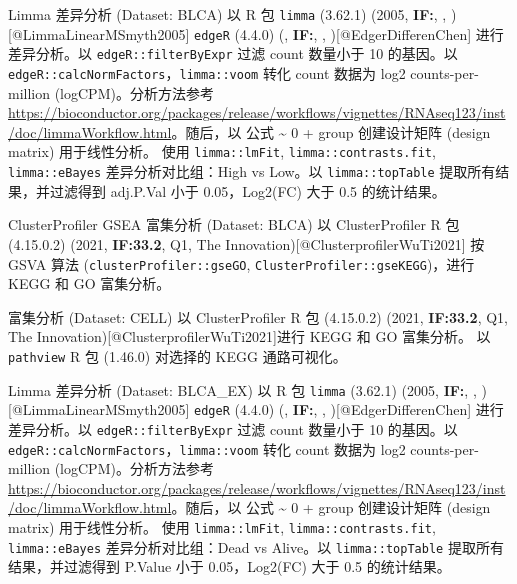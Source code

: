 \documentclass[
  ignorenonframetext,
]{beamer}
\begin{document}
\begin{frame}[fragile]{Limma 差异分析 (Dataset: BLCA)}
\protect\hypertarget{limma-ux5deeux5f02ux5206ux6790-dataset-blca}{}
以 R 包 \texttt{limma} (3.62.1) (2005, \textbf{IF:}, ,
){[}@LimmaLinearMSmyth2005{]} \texttt{edgeR} (4.4.0) (, \textbf{IF:}, ,
){[}@EdgerDifferenChen{]} 进行差异分析。以 \texttt{edgeR::filterByExpr}
过滤 count 数量小于 10 的基因。以
\texttt{edgeR::calcNormFactors}，\texttt{limma::voom} 转化 count 数据为
log2 counts-per-million (logCPM)。分析方法参考
\url{https://bioconductor.org/packages/release/workflows/vignettes/RNAseq123/inst/doc/limmaWorkflow.html}。随后，以
公式 \textasciitilde{} 0 + group 创建设计矩阵 (design matrix)
用于线性分析。 使用 \texttt{limma::lmFit},
\texttt{limma::contrasts.fit}, \texttt{limma::eBayes}
差异分析对比组：High vs Low。以 \texttt{limma::topTable}
提取所有结果，并过滤得到 adj.P.Val 小于
0.05，\textbar Log2(FC)\textbar{} 大于 0.5 的统计结果。
\end{frame}

\begin{frame}[fragile]{ClusterProfiler GSEA 富集分析 (Dataset: BLCA)}
\protect\hypertarget{clusterprofiler-gsea-ux5bccux96c6ux5206ux6790-dataset-blca}{}
以 ClusterProfiler R 包 (4.15.0.2) (2021, \textbf{IF:33.2}, Q1, The
Innovation){[}@ClusterprofilerWuTi2021{]} 按 GSVA 算法
(\texttt{clusterProfiler::gseGO},
\texttt{ClusterProfiler::gseKEGG})，进行 KEGG 和 GO 富集分析。
\end{frame}

\begin{frame}[fragile]{富集分析 (Dataset: CELL)}
\protect\hypertarget{ux5bccux96c6ux5206ux6790-dataset-cell}{}
以 ClusterProfiler R 包 (4.15.0.2) (2021, \textbf{IF:33.2}, Q1, The
Innovation){[}@ClusterprofilerWuTi2021{]}进行 KEGG 和 GO 富集分析。 以
\texttt{pathview} R 包 (1.46.0) 对选择的 KEGG 通路可视化。
\end{frame}

\begin{frame}[fragile]{Limma 差异分析 (Dataset: BLCA\_EX)}
\protect\hypertarget{limma-ux5deeux5f02ux5206ux6790-dataset-blca_ex}{}
以 R 包 \texttt{limma} (3.62.1) (2005, \textbf{IF:}, ,
){[}@LimmaLinearMSmyth2005{]} \texttt{edgeR} (4.4.0) (, \textbf{IF:}, ,
){[}@EdgerDifferenChen{]} 进行差异分析。以 \texttt{edgeR::filterByExpr}
过滤 count 数量小于 10 的基因。以
\texttt{edgeR::calcNormFactors}，\texttt{limma::voom} 转化 count 数据为
log2 counts-per-million (logCPM)。分析方法参考
\url{https://bioconductor.org/packages/release/workflows/vignettes/RNAseq123/inst/doc/limmaWorkflow.html}。随后，以
公式 \textasciitilde{} 0 + group 创建设计矩阵 (design matrix)
用于线性分析。 使用 \texttt{limma::lmFit},
\texttt{limma::contrasts.fit}, \texttt{limma::eBayes}
差异分析对比组：Dead vs Alive。以 \texttt{limma::topTable}
提取所有结果，并过滤得到 P.Value 小于 0.05，\textbar Log2(FC)\textbar{}
大于 0.5 的统计结果。
\end{frame}
\end{document}
